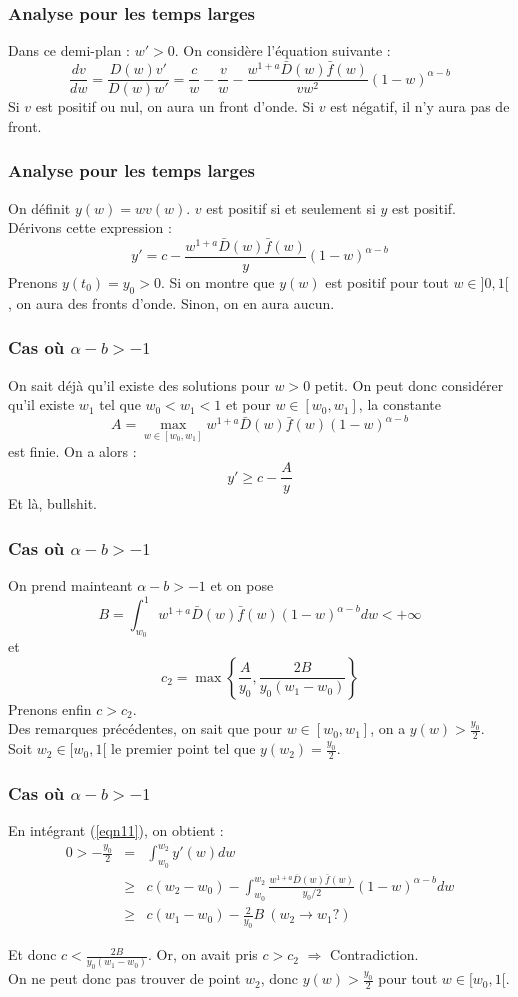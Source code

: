 \documentclass[handout]{beamer}
\begin{document}
\begin{frame}
	\frametitle{Analyse pour les temps larges}
Dans ce demi-plan : $w'>0$. On considère l'équation suivante : 
\[\frac{dv}{dw} = \frac{D(w)v'}{D(w)w'}=\frac{c}{w}-\frac{v}{w}-\frac{w^{1+a}\bar{D}(w)\bar{f}(w)}{vw^2}(1-w)^{\alpha-b}\]
Si $v$ est positif ou nul, on aura un front d'onde. Si $v$ est négatif, il n'y aura pas de front. 
\end{frame}

\begin{frame}
	\frametitle{Analyse pour les temps larges}
On définit $y(w)=wv(w)$. $v$ est positif si et seulement si $y$ est positif. Dérivons cette expression : 
\begin{equation} \label{eqn11} y'=c-\frac{w^{1+a}\bar{D}(w)\bar{f}(w)}{y}(1-w)^{\alpha-b}\end{equation}
Prenons $y(t_0)=y_0>0$. Si on montre que $y(w)$ est positif pour tout $w\in]0,1[$, on aura des fronts d'onde. Sinon, on en aura aucun.
\end{frame}

\begin{frame}
	\frametitle{Cas où $\alpha-b>-1$}
On sait déjà qu'il existe des solutions pour $w>0$ petit. On peut donc considérer qu'il existe $w_1$ tel que $w_0<w_1<1$ et pour $w\in[w_0,w_1]$, la constante 
\[A=\max_{w\in[w_0,w_1]}w^{1+a}\bar{D}(w)\bar{f}(w)(1-w)^{\alpha-b}\]
est finie. On a alors : \[y'\geq c-\frac{A}{y}\]
Et là, bullshit.
\end{frame}

\begin{frame}
	\frametitle{Cas où $\alpha-b>-1$}
On prend mainteant $\alpha-b>-1$ et on pose \[B=\int_{w_0}^1 w^{1+a}\bar{D}(w)\bar{f}(w)(1-w)^{\alpha-b}dw<+\infty\]
et \[c_2=\max \left\{\frac{A}{y_0}, \frac{2B}{y_0(w_1-w_0)}\right\}\]
Prenons enfin $c>c_2$.\\
Des remarques précédentes, on sait que pour $w\in[w_0,w_1]$, on a $y(w)>\frac{y_0}{2}$. Soit $w_2\in[w_0,1[$ le premier point tel que $y(w_2)=\frac{y_0}{2}$. 
\end{frame}

\begin{frame}
	\frametitle{Cas où $\alpha-b>-1$}
En intégrant (\ref{eqn11}), on obtient : 
\begin{eqnarray*}
	0>-\frac{y_0}{2}&=&\int_{w_0}^{w_2} y'(w)dw\\
			&\geq& c(w_2-w_0) - \int_{w_0}^{w_2} \frac{w^{1+a}\bar{D}(w)\bar{f}(w)}{y_0/2}(1-w)^{\alpha-b} dw\\
			&\geq& c(w_1-w_0) - \frac{2}{y_0} B\ (w_2\rightarrow w_1 ?)
\end{eqnarray*}

Et donc $c<\frac{2B}{y_0(w_1-w_0)}$. Or, on avait pris $c>c_2$ $\Rightarrow$ Contradiction. \\
On ne peut donc pas trouver de point $w_2$, donc $y(w)>\frac{y_0}{2}$ pour tout $w\in[w_0,1[$.
\end{frame}
\end{document}
